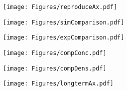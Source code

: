 \begin{figure}
  \centering
  \texttt{[image: Figures/reproduceAx.pdf]}
\end{figure}

\begin{figure}
  \centering
  \texttt{[image: Figures/simComparison.pdf]}
\end{figure}

\begin{figure}
  \centering
  \texttt{[image: Figures/expComparison.pdf]}
\end{figure}

\begin{figure}
  \centering
  \texttt{[image: Figures/compConc.pdf]}
\end{figure}

\begin{figure}
  \centering
  \texttt{[image: Figures/compDens.pdf]}
\end{figure}

\begin{figure}
  \centering
  \texttt{[image: Figures/longtermAx.pdf]}
\end{figure}